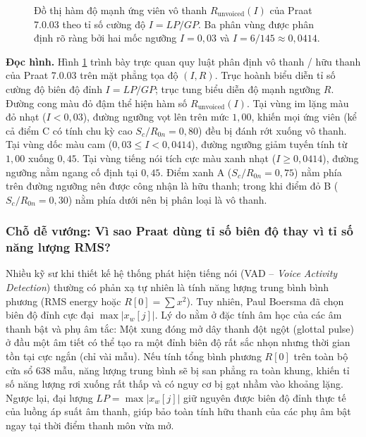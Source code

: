 \begin{figure}[htbp]
    \centering
    
    \caption{Đồ thị hàm độ mạnh ứng viên vô thanh $R_{\text{unvoiced}}(I)$ của Praat 7.0.03 theo tỉ số cường độ $I = LP / GP$. Ba phân vùng được phân định rõ ràng bởi hai mốc ngưỡng $I = 0{,}03$ và $I = 6/145 \approx 0{,}0414$.}
    \label{fig:ch10_voicing_curve}
\end{figure}

\textbf{Đọc hình.} Hình \ref{fig:ch10_voicing_curve} trình bày trực quan quy luật phân định vô thanh / hữu thanh của Praat 7.0.03 trên mặt phẳng tọa độ $(I, R)$. Trục hoành biểu diễn tỉ số cường độ biên độ đỉnh $I = LP / GP$; trục tung biểu diễn độ mạnh ngưỡng $R$. Đường cong màu đỏ đậm thể hiện hàm số $R_{\text{unvoiced}}(I)$. Tại vùng im lặng màu đỏ nhạt ($I < 0{,}03$), đường ngưỡng vọt lên trên mức $1{,}00$, khiến mọi ứng viên (kể cả điểm C có tính chu kỳ cao $S_c/R_{0n} = 0{,}80$) đều bị đánh rớt xuống vô thanh. Tại vùng dốc màu cam ($0{,}03 \le I < 0{,}0414$), đường ngưỡng giảm tuyến tính từ $1{,}00$ xuống $0{,}45$. Tại vùng tiếng nói tích cực màu xanh nhạt ($I \ge 0{,}0414$), đường ngưỡng nằm ngang cố định tại $0{,}45$. Điểm xanh A ($S_c/R_{0n} = 0{,}75$) nằm phía trên đường ngưỡng nên được công nhận là hữu thanh; trong khi điểm đỏ B ($S_c/R_{0n} = 0{,}30$) nằm phía dưới nên bị phân loại là vô thanh.

\subsubsection*{Chỗ dễ vướng: Vì sao Praat dùng tỉ số biên độ thay vì tỉ số năng lượng RMS?}
Nhiều kỹ sư khi thiết kế hệ thống phát hiện tiếng nói (VAD -- \emph{Voice Activity Detection}) thường có phản xạ tự nhiên là tính năng lượng trung bình bình phương (RMS energy hoặc $R[0] = \sum x^2$). Tuy nhiên, Paul Boersma đã chọn biên độ đỉnh cực đại $\max |x_w[j]|$. Lý do nằm ở đặc tính âm học của các âm thanh bật và phụ âm tắc:
Một xung đóng mở dây thanh đột ngột (glottal pulse) ở đầu một âm tiết có thể tạo ra một đỉnh biên độ rất sắc nhọn nhưng thời gian tồn tại cực ngắn (chỉ vài mẫu). Nếu tính tổng bình phương $R[0]$ trên toàn bộ cửa sổ 638 mẫu, năng lượng trung bình sẽ bị san phẳng ra toàn khung, khiến tỉ số năng lượng rơi xuống rất thấp và có nguy cơ bị gạt nhầm vào khoảng lặng. Ngược lại, đại lượng $LP = \max |x_w[j]|$ giữ nguyên được biên độ đỉnh thực tế của luồng áp suất âm thanh, giúp bảo toàn tính hữu thanh của các phụ âm bật ngay tại thời điểm thanh môn vừa mở.

